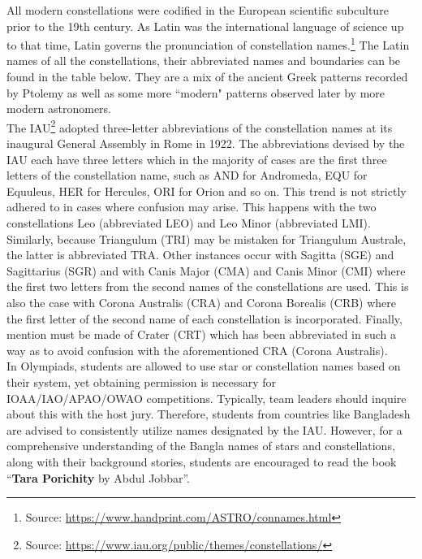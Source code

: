 \documentclass[a4paper,12pt]{extarticle}
\begin{document}
All modern constellations were codified in the European scientific subculture prior to the 19th century. As Latin was the international language of science up to that time, Latin governs the pronunciation of constellation names.\footnote{Source: \url{https://www.handprint.com/ASTRO/connames.html}} The Latin names of all the constellations, their abbreviated names and boundaries can be found in the table below. They are a mix of the ancient Greek patterns recorded by Ptolemy as well as some more ``modern" patterns observed later by more modern astronomers.\\

The IAU\footnote{Source: \url{https://www.iau.org/public/themes/constellations/}} adopted three-letter abbreviations of the constellation names at its inaugural General Assembly in Rome in 1922. The abbreviations devised by the IAU each have three letters which in the majority of cases are the first three letters of the constellation name, such as AND for Andromeda, EQU for Equuleus, HER for Hercules, ORI for Orion and so on. This trend is not strictly adhered to in cases where confusion may arise. This happens with the two constellations Leo (abbreviated LEO) and Leo Minor (abbreviated LMI). Similarly, because Triangulum (TRI) may be mistaken for Triangulum Australe, the latter is abbreviated TRA. Other instances occur with Sagitta (SGE) and Sagittarius (SGR) and with Canis Major (CMA) and Canis Minor (CMI) where the first two letters from the second names of the constellations are used. This is also the case with Corona Australis (CRA) and Corona Borealis (CRB) where the first letter of the second name of each constellation is incorporated. Finally, mention must be made of Crater (CRT) which has been abbreviated in such a way as to avoid confusion with the aforementioned CRA (Corona Australis).\\

In Olympiads, students are allowed to use star or constellation names based on their system, yet obtaining permission is necessary for IOAA/IAO/APAO/OWAO competitions. Typically, team leaders should inquire about this with the host jury. Therefore, students from countries like Bangladesh are advised to consistently utilize names designated by the IAU. However, for a comprehensive understanding of the Bangla names of stars and constellations, along with their background stories, students are encouraged to read the book {\color{blue}``\textbf{Tara Porichity} by Abdul Jobbar''}.\\
\end{document}
